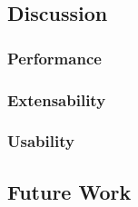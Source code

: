 \subsection{Discussion}

\subsubsection{Performance}
\subsubsection{Extensability}
\subsubsection{Usability}

\subsection{Future Work}